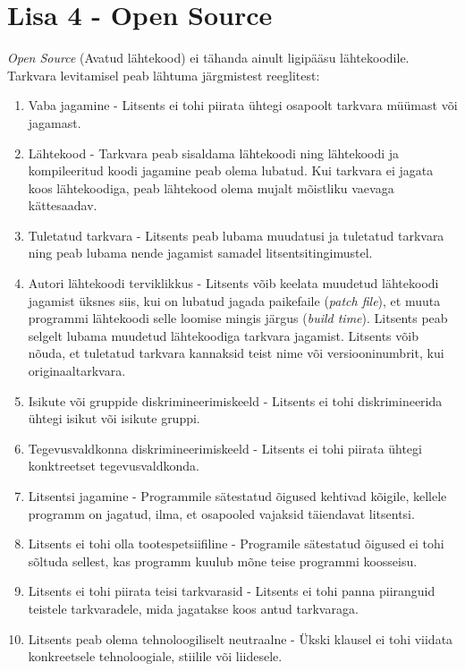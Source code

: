 \documentclass[a4paper,12pt]{article} %
\begin{document}
\section*{Lisa 4 - Open Source}
\label{lisa_open_source}
\textit{Open Source} (Avatud lähtekood) ei tähanda ainult ligipääsu lähtekoodile. Tarkvara levitamisel peab lähtuma järgmistest reeglitest:
\begin{enumerate}
\item Vaba jagamine - Litsents ei tohi piirata ühtegi osapoolt tarkvara müümast või jagamast.
\item Lähtekood -  Tarkvara peab sisaldama lähtekoodi ning lähtekoodi ja kompileeritud koodi jagamine peab olema lubatud. Kui tarkvara ei jagata koos lähtekoodiga, peab lähtekood olema mujalt mõistliku vaevaga kättesaadav.
\item Tuletatud tarkvara - Litsents peab lubama muudatusi ja tuletatud tarkvara ning peab lubama nende jagamist samadel litsentsitingimustel.
\item Autori lähtekoodi terviklikkus - Litsents võib keelata muudetud lähtekoodi jagamist üksnes siis, kui on lubatud jagada paikefaile (\textit{patch file}), et muuta programmi lähtekoodi selle loomise mingis järgus (\textit{build time}). Litsents peab selgelt lubama muudetud lähtekoodiga tarkvara jagamist. Litsents võib nõuda, et tuletatud tarkvara kannaksid teist nime või versiooninumbrit, kui originaaltarkvara.
\item Isikute või gruppide diskrimineerimiskeeld - Litsents ei tohi diskrimineerida ühtegi isikut või isikute gruppi.
\item Tegevusvaldkonna diskrimineerimiskeeld - Litsents ei tohi piirata ühtegi konktreetset tegevusvaldkonda.
\item Litsentsi jagamine - Programmile sätestatud õigused kehtivad kõigile, kellele programm on jagatud, ilma, et osapooled vajaksid täiendavat litsentsi.
\item Litsents ei tohi olla tootespetsiifiline - Programile sätestatud õigused ei tohi sõltuda sellest, kas programm kuulub mõne teise programmi koosseisu.
\item Litsents ei tohi piirata teisi tarkvarasid - Litsents ei tohi panna piiranguid teistele tarkvaradele, mida jagatakse koos antud tarkvaraga.
\item Litsents peab olema tehnoloogiliselt neutraalne - Ükski klausel ei tohi viidata konkreetsele tehnoloogiale, stiilile või liidesele.
\end{enumerate}
\cite{Open_Source_Def}
\end{document}

